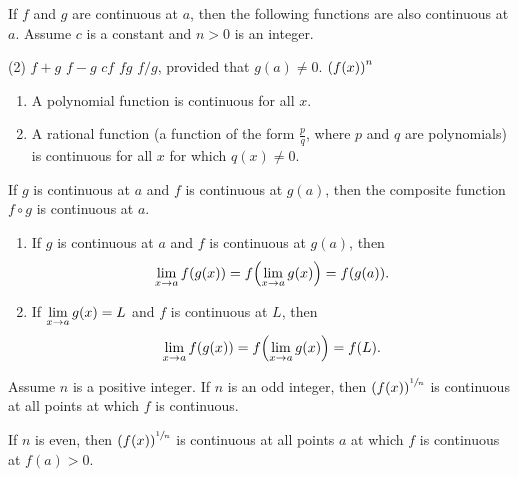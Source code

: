 \documentclass[mathNotesPreamble]{subfiles}
\begin{document}
  \pagebreak

  \begin{thmBox*}
    If $f$ and $g$ are continuous at $a$, then the following functions are also continuous at $a$. Assume $c$ is a constant and $n>0$ is an integer.
    \begin{tasks}(2)
      \task $f+g$
      \task $f-g$
      \task $cf$
      \task $fg$
      \task $f/g$, provided that $g(a)\neq 0$.
      \task ${\left(f(x)\right)}^n$
    \end{tasks}
  \end{thmBox*}

  \begin{thmBox*}
    \begin{enumerate}[label=\alph*)]
      \item A polynomial function is continuous for all $x$.
      \item A rational function (a function of the form $\frac{p}{q}$, where $p$ and $q$ are polynomials) is continuous for all $x$ for which $q(x)\neq 0$.
    \end{enumerate}
  \end{thmBox*}

  \begin{thmBox*}
    If $g$ is continuous at $a$ and $f$ is continuous at $g(a)$, then the composite function $f\circ g$ is continuous at $a$.
  \end{thmBox*}

  \begin{thmBox*}
    \begin{enumerate}
      \item If $g$ is continuous at $a$ and $f$ is continuous at $g(a)$, then
        $$\lim_{x \to a} f{\left(g(x)\right)}=f{\left(\lim_{x \to a} g(x)\right)}=f{\left(g(a)\right)}.$$
      \item If $\displaystyle\lim_{x \to a} g(x)=L$ and $f$ is continuous at $L$, then
        $$\lim_{x \to a} f{\left(g(x)\right)}=f{\left(\lim_{x \to a}g(x)\right)}=f{\left(L\right)}.$$
    \end{enumerate}
  \end{thmBox*}
  \pagebreak

  \begin{thmBox*}
    Assume $n$ is a positive integer. If $n$ is an odd integer, then ${\left(f(x)\right)}^{\sfrac{1}{n}}$ is continuous at all points at which $f$ is continuous.

    If $n$ is even, then ${\left(f(x)\right)}^{\sfrac{1}{n}}$ is continuous at all points $a$ at which $f$ is continuous at $f(a)>0$.
  \end{thmBox*}
  \vspace*{15pt}
\end{document}
